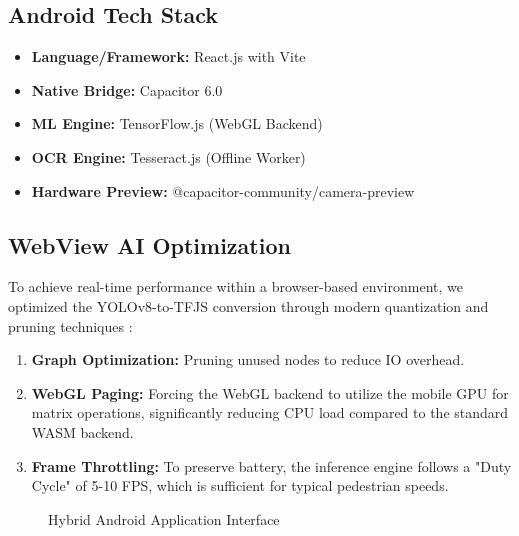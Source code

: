\documentclass[11pt, a4paper, twocolumn]{article}
\begin{document}
\subsection{Android Tech Stack}
\begin{itemize}
    \item \textbf{Language/Framework:} React.js with Vite
    \item \textbf{Native Bridge:} Capacitor 6.0
    \item \textbf{ML Engine:} TensorFlow.js \cite{tfjs} (WebGL Backend)
    \item \textbf{OCR Engine:} Tesseract.js (Offline Worker)
    \item \textbf{Hardware Preview:} @capacitor-community/camera-preview
\end{itemize}

\subsection{WebView AI Optimization}
To achieve real-time performance within a browser-based environment, we optimized the YOLOv8-to-TFJS conversion through modern quantization and pruning techniques \cite{quantization}:
\begin{enumerate}
    \item \textbf{Graph Optimization:} Pruning unused nodes to reduce IO overhead.
    \item \textbf{WebGL Paging:} Forcing the WebGL backend to utilize the mobile GPU for matrix operations, significantly reducing CPU load compared to the standard WASM backend.
    \item \textbf{Frame Throttling:} To preserve battery, the inference engine follows a "Duty Cycle" of 5-10 FPS, which is sufficient for typical pedestrian speeds.
\end{enumerate}

\begin{figure}[h]
    \centering
    \caption{Hybrid Android Application Interface}
    \label{fig:android_app}
\end{figure}
\end{document}
